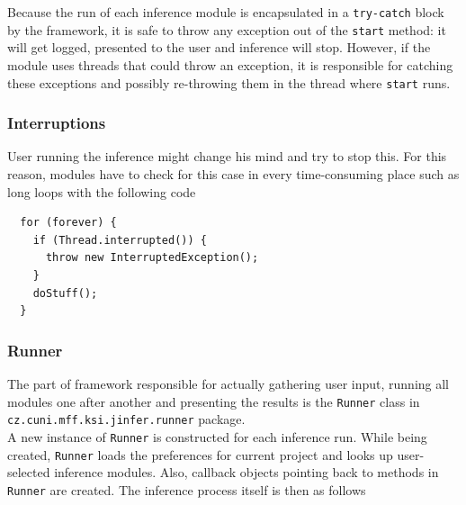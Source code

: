 \documentclass[a4paper,10pt,oneside]{article}
\newcommand{\code}[1]{\texttt{#1}}
\begin{document}
Because the run of each inference module is encapsulated in a \code{try-catch} block by the framework, it is safe to throw any exception out of the \code{start} method: it will get logged, presented to the user and inference will stop. However, if the module uses threads that could throw an exception, it is responsible for catching these exceptions and possibly re-throwing them in the thread where \code{start} runs.

\subsubsection{Interruptions}

User running the inference might change his mind and try to stop this. For this reason, modules have to check for this case in every time-consuming place such as long loops with the following code
\begin{verbatim}
  for (forever) {
    if (Thread.interrupted()) {
      throw new InterruptedException();
    }
    doStuff();
  }
\end{verbatim}

\subsubsection{Runner}

The part of framework responsible for actually gathering user input, running all modules one after another and presenting the results is the \code{Runner} class  in \code{cz.cuni.mff.ksi.jinfer.runner} package.\\

A new instance of \code{Runner} is constructed for each inference run. While being created, \code{Runner}  loads the preferences for current project and looks up user-selected inference modules. Also, callback objects pointing back to methods in \code{Runner} are created. The inference process itself is then as follows
\end{document}
